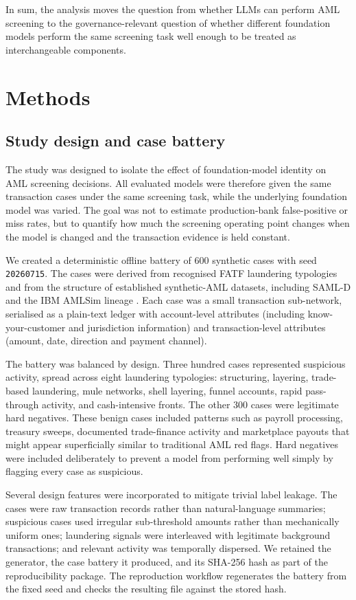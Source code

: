 \documentclass[pdflatex,sn-basic,Numbered]{sn-jnl}
\begin{document}
In sum, the analysis moves the question from whether LLMs can perform AML screening to the governance-relevant question of whether different foundation models perform the same screening task well enough to be treated as interchangeable components.

\section{Methods}\label{sec:methods}

\subsection{Study design and case battery}

The study was designed to isolate the effect of foundation-model identity on AML screening decisions. All evaluated models were therefore given the same transaction cases under the same screening task, while the underlying foundation model was varied. The goal was not to estimate production-bank false-positive or miss rates, but to quantify how much the screening operating point changes when the model is changed and the transaction evidence is held constant.

We created a deterministic offline battery of 600 synthetic cases with seed \texttt{20260715}. The cases were derived from recognised FATF laundering typologies and from the structure of established synthetic-AML datasets, including SAML-D and the IBM AMLSim lineage \cite{samld,weber2018}. Each case was a small transaction sub-network, serialised as a plain-text ledger with account-level attributes (including know-your-customer and jurisdiction information) and transaction-level attributes (amount, date, direction and payment channel).

The battery was balanced by design. Three hundred cases represented suspicious activity, spread across eight laundering typologies: structuring, layering, trade-based laundering, mule networks, shell layering, funnel accounts, rapid pass-through activity, and cash-intensive fronts. The other 300 cases were legitimate hard negatives. These benign cases included patterns such as payroll processing, treasury sweeps, documented trade-finance activity and marketplace payouts that might appear superficially similar to traditional AML red flags. Hard negatives were included deliberately to prevent a model from performing well simply by flagging every case as suspicious.

Several design features were incorporated to mitigate trivial label leakage. The cases were raw transaction records rather than natural-language summaries; suspicious cases used irregular sub-threshold amounts rather than mechanically uniform ones; laundering signals were interleaved with legitimate background transactions; and relevant activity was temporally dispersed. We retained the generator, the case battery it produced, and its SHA-256 hash as part of the reproducibility package. The reproduction workflow regenerates the battery from the fixed seed and checks the resulting file against the stored hash.
\end{document}
